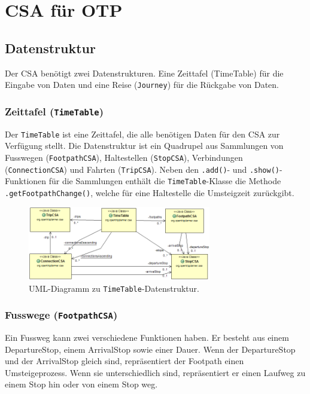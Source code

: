 \section{CSA für OTP}

\subsection{Datenstruktur}
Der CSA benötigt zwei Datenstrukturen. Eine Zeittafel (TimeTable) für die Eingabe von Daten und eine Reise (\texttt{Journey}) für die Rückgabe von Daten. 

\subsubsection{Zeittafel (\texttt{TimeTable})}
Der \texttt{TimeTable} ist eine \hypertarget{timetable}{Zeittafel}, die alle benötigen Daten für den CSA zur Verfügung stellt. Die Datenstruktur ist ein Quadrupel aus Sammlungen von Fusswegen (\texttt{FootpathCSA}), Haltestellen (\texttt{StopCSA}), Verbindungen (\texttt{ConnectionCSA}) und Fahrten (\texttt{TripCSA}).\newline 
Neben den \texttt{.add()}- und \texttt{.show()}-Funktionen für die Sammlungen enthält die \texttt{TimeTable}-Klasse die Methode \texttt{.getFootpathChange()}, welche für eine Haltestelle die Umsteigzeit zurückgibt.

\begin{figure}[htb]
	\centering
	\includegraphics[width=8cm]{img/TimeTable.png}
	\caption{UML-Diagramm zu \texttt{TimeTable}-Datenstruktur.}
	\label{fig:uml-timetable}
\end{figure}

\subsubsection{Fusswege (\texttt{FootpathCSA})}

Ein \hypertarget{footpath}{Fussweg} kann zwei verschiedene Funktionen haben. Er besteht aus einem DepartureStop, einem ArrivalStop sowie einer Dauer. Wenn der DepartureStop und der ArrivalStop gleich sind, repräsentiert der Footpath einen Umsteigeprozess. Wenn sie unterschiedlich sind, repräsentiert er einen Laufweg zu einem Stop hin oder von einem Stop weg.

